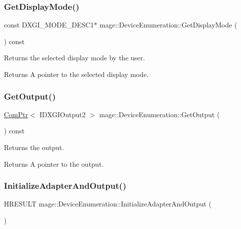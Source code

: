 \subsubsection{\texorpdfstring{Get\+Display\+Mode()}{GetDisplayMode()}}
{\footnotesize\ttfamily const D\+X\+G\+I\+\_\+\+M\+O\+D\+E\+\_\+\+D\+E\+S\+C1$\ast$ mage\+::\+Device\+Enumeration\+::\+Get\+Display\+Mode (\begin{DoxyParamCaption}{ }\end{DoxyParamCaption}) const}

Returns the selected display mode by the user.

\begin{DoxyReturn}{Returns}
A pointer to the selected display mode. 
\end{DoxyReturn}
\hypertarget{classmage_1_1_device_enumeration_ac3958dd53d2fdb8ff645d8dca6dc5fdd}{}\label{classmage_1_1_device_enumeration_ac3958dd53d2fdb8ff645d8dca6dc5fdd} 
\subsubsection{\texorpdfstring{Get\+Output()}{GetOutput()}}
{\footnotesize\ttfamily \hyperlink{namespacemage_ae74f374780900893caa5555d1031fd79}{Com\+Ptr}$<$ I\+D\+X\+G\+I\+Output2 $>$ mage\+::\+Device\+Enumeration\+::\+Get\+Output (\begin{DoxyParamCaption}{ }\end{DoxyParamCaption}) const}

Returns the output.

\begin{DoxyReturn}{Returns}
A pointer to the output. 
\end{DoxyReturn}
\hypertarget{classmage_1_1_device_enumeration_a56806d9667b446bf14236b1f42aefb28}{}\label{classmage_1_1_device_enumeration_a56806d9667b446bf14236b1f42aefb28} 
\subsubsection{\texorpdfstring{Initialize\+Adapter\+And\+Output()}{InitializeAdapterAndOutput()}}
{\footnotesize\ttfamily H\+R\+E\+S\+U\+LT mage\+::\+Device\+Enumeration\+::\+Initialize\+Adapter\+And\+Output (\begin{DoxyParamCaption}{ }\end{DoxyParamCaption})\hspace{0.3cm}{\ttfamily [private]}}

